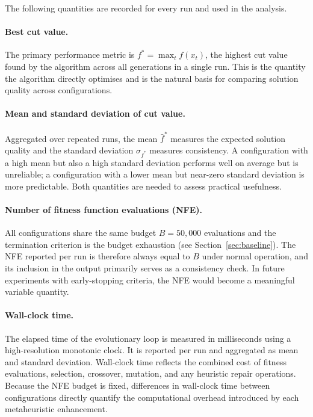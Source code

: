 \documentclass[12pt]{article}
\begin{document}
The following quantities are recorded for every run and used in the analysis.

\paragraph{Best cut value.}
The primary performance metric is $f^* = \max_t f(x_t)$, the highest cut value
found by the algorithm across all generations in a single run.
This is the quantity the algorithm directly optimises and is the natural basis for
comparing solution quality across configurations.

\paragraph{Mean and standard deviation of cut value.}
Aggregated over repeated runs, the mean $\bar{f}^*$ measures the expected solution
quality and the standard deviation $\sigma_{f^*}$ measures consistency.
A configuration with a high mean but also a high standard deviation performs well
on average but is unreliable; a configuration with a lower mean but near-zero
standard deviation is more predictable.
Both quantities are needed to assess practical usefulness.

\paragraph{Number of fitness function evaluations (NFE).}
All configurations share the same budget $B = 50{,}000$ evaluations and the
termination criterion is the budget exhaustion (see Section~\ref{sec:baseline}).
The NFE reported per run is therefore always equal to $B$ under normal operation,
and its inclusion in the output primarily serves as a consistency check.
In future experiments with early-stopping criteria, the NFE would become a
meaningful variable quantity.

\paragraph{Wall-clock time.}
The elapsed time of the evolutionary loop is measured in milliseconds using a
high-resolution monotonic clock.
It is reported per run and aggregated as mean and standard deviation.
Wall-clock time reflects the combined cost of fitness evaluations, selection,
crossover, mutation, and any heuristic repair operations.
Because the NFE budget is fixed, differences in wall-clock time between
configurations directly quantify the computational overhead introduced by each
metaheuristic enhancement.
\end{document}
